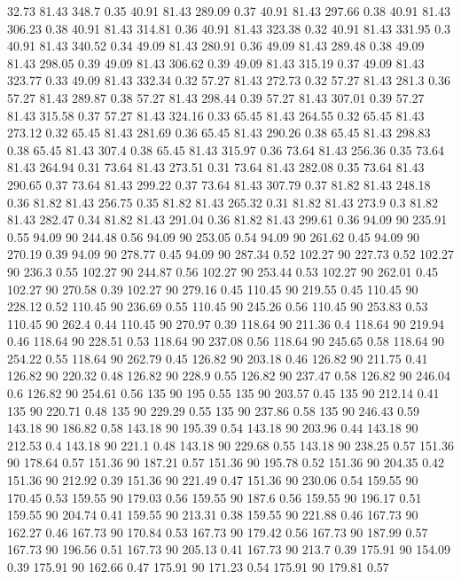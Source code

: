 32.73	81.43	348.7	0.35
40.91	81.43	289.09	0.37
40.91	81.43	297.66	0.38
40.91	81.43	306.23	0.38
40.91	81.43	314.81	0.36
40.91	81.43	323.38	0.32
40.91	81.43	331.95	0.3
40.91	81.43	340.52	0.34
49.09	81.43	280.91	0.36
49.09	81.43	289.48	0.38
49.09	81.43	298.05	0.39
49.09	81.43	306.62	0.39
49.09	81.43	315.19	0.37
49.09	81.43	323.77	0.33
49.09	81.43	332.34	0.32
57.27	81.43	272.73	0.32
57.27	81.43	281.3	0.36
57.27	81.43	289.87	0.38
57.27	81.43	298.44	0.39
57.27	81.43	307.01	0.39
57.27	81.43	315.58	0.37
57.27	81.43	324.16	0.33
65.45	81.43	264.55	0.32
65.45	81.43	273.12	0.32
65.45	81.43	281.69	0.36
65.45	81.43	290.26	0.38
65.45	81.43	298.83	0.38
65.45	81.43	307.4	0.38
65.45	81.43	315.97	0.36
73.64	81.43	256.36	0.35
73.64	81.43	264.94	0.31
73.64	81.43	273.51	0.31
73.64	81.43	282.08	0.35
73.64	81.43	290.65	0.37
73.64	81.43	299.22	0.37
73.64	81.43	307.79	0.37
81.82	81.43	248.18	0.36
81.82	81.43	256.75	0.35
81.82	81.43	265.32	0.31
81.82	81.43	273.9	0.3
81.82	81.43	282.47	0.34
81.82	81.43	291.04	0.36
81.82	81.43	299.61	0.36
94.09	90	235.91	0.55
94.09	90	244.48	0.56
94.09	90	253.05	0.54
94.09	90	261.62	0.45
94.09	90	270.19	0.39
94.09	90	278.77	0.45
94.09	90	287.34	0.52
102.27	90	227.73	0.52
102.27	90	236.3	0.55
102.27	90	244.87	0.56
102.27	90	253.44	0.53
102.27	90	262.01	0.45
102.27	90	270.58	0.39
102.27	90	279.16	0.45
110.45	90	219.55	0.45
110.45	90	228.12	0.52
110.45	90	236.69	0.55
110.45	90	245.26	0.56
110.45	90	253.83	0.53
110.45	90	262.4	0.44
110.45	90	270.97	0.39
118.64	90	211.36	0.4
118.64	90	219.94	0.46
118.64	90	228.51	0.53
118.64	90	237.08	0.56
118.64	90	245.65	0.58
118.64	90	254.22	0.55
118.64	90	262.79	0.45
126.82	90	203.18	0.46
126.82	90	211.75	0.41
126.82	90	220.32	0.48
126.82	90	228.9	0.55
126.82	90	237.47	0.58
126.82	90	246.04	0.6
126.82	90	254.61	0.56
135	90	195	0.55
135	90	203.57	0.45
135	90	212.14	0.41
135	90	220.71	0.48
135	90	229.29	0.55
135	90	237.86	0.58
135	90	246.43	0.59
143.18	90	186.82	0.58
143.18	90	195.39	0.54
143.18	90	203.96	0.44
143.18	90	212.53	0.4
143.18	90	221.1	0.48
143.18	90	229.68	0.55
143.18	90	238.25	0.57
151.36	90	178.64	0.57
151.36	90	187.21	0.57
151.36	90	195.78	0.52
151.36	90	204.35	0.42
151.36	90	212.92	0.39
151.36	90	221.49	0.47
151.36	90	230.06	0.54
159.55	90	170.45	0.53
159.55	90	179.03	0.56
159.55	90	187.6	0.56
159.55	90	196.17	0.51
159.55	90	204.74	0.41
159.55	90	213.31	0.38
159.55	90	221.88	0.46
167.73	90	162.27	0.46
167.73	90	170.84	0.53
167.73	90	179.42	0.56
167.73	90	187.99	0.57
167.73	90	196.56	0.51
167.73	90	205.13	0.41
167.73	90	213.7	0.39
175.91	90	154.09	0.39
175.91	90	162.66	0.47
175.91	90	171.23	0.54
175.91	90	179.81	0.57
